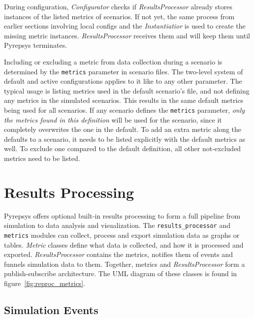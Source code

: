 \documentclass[%
    ]{\PathToTumTemplate/thesis/tum_thesis}
\begin{document}
During configuration, \emph{Configurator} checks if \emph{ResultsProcessor} already stores instances of the listed metrics of scenarios.
If not yet, the same process from earlier sections involving local configs and the \emph{Instantiatior} is used to create the missing metric instances.
\emph{ResultsProcessor} receives them and will keep them until Pyrepsys terminates.

Including or excluding a metric from data collection during a scenario is determined by the \lstinline{metrics} parameter in scenario files.
The two-level system of default and active configurations applies to it like to any other parameter.
The typical usage is listing metrics used in the default scenario's file, and not defining any metrics in the simulated scenarios.
This results in the same default metrics being used for all scenarios.
If any scenario defines the \lstinline{metrics} parameter, \emph{only the metrics found in this definition} will be used for the scenario, since it completely overwrites the one in the default.
To add an extra metric along the defaults to a scenario, it needs to be listed explicitly with the default metrics as well.
To exclude one compared to the default definition, all other not-excluded metrics need to be listed.



\section{Results Processing}\label{sec:impl_results_processing}
Pyrepsys offers optional built-in results processing to form a full pipeline from simulation to data analysis and visualization.
The \lstinline{results_processor} and \lstinline{metrics} modules can collect, process and export simulation data as graphs or tables.
\emph{Metric} classes define what data is collected, and how it is processed and exported.
\emph{ResultsProcessor} contains the metrics, notifies them of events and funnels simulation data to them.
Together, metrics and \emph{ResultsProcessor} form a publish-subscribe architecture.
The UML diagram of these classes is found in figure~\ref{fig:reproc_metrics}.


\subsection{Simulation Events}
\end{document}
